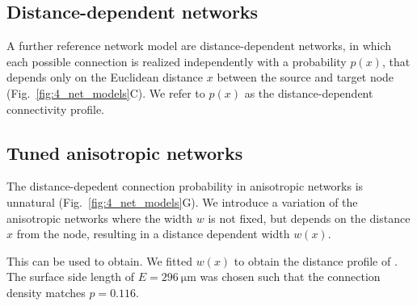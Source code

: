 








\subsection*{Distance-dependent networks}

A further reference network model are distance-dependent networks, in which each possible connection is realized independently with a probability $p(x)$, that depends only on the Euclidean distance $x$ between the source and target node (Fig.~\ref{fig:4_net_models}C). We refer to $p(x)$ as the distance-dependent connectivity profile.


\subsection*{Tuned anisotropic networks}

The distance-depedent connection probability in anisotropic networks is unnatural (Fig.~\ref{fig:4_net_models}G). We introduce a variation of the anisotropic networks where the width $w$ is not fixed, but depends on the distance $x$ from the node, resulting in a distance dependent width $w(x)$.

This can be used to obtain. We fitted $w(x)$ to obtain the distance profile of . The surface side length of $E=\SI{296}{\micro\meter}$ was chosen such that the connection density matches $p=0.116$.




